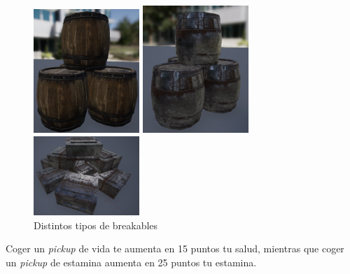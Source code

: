 \begin{itemize}
\begin{figure}[H]
  \begin{minipage}{0.33\textwidth}
    \centering
    \includegraphics[width=4cm]{./images/Dest_Barr2.png}
  \end{minipage}%
  \hspace{0.5mm}
  \begin{minipage}{0.33\textwidth}
    \centering
    \includegraphics[width=4cm]{./images/Dest_Barr.png}
  \end{minipage}
  \hspace{0.5mm}
  \begin{minipage}{0.33\textwidth}
    \centering
    \includegraphics[width=4cm]{./images/Dest_Box.png}
  \end{minipage}
  \caption{Distintos tipos de breakables}
  \label{Breakables}
\end{figure}

Coger un \textit{pickup} de vida te aumenta en 15 puntos tu salud, mientras que coger un \textit{pickup} de estamina aumenta en 25 puntos tu estamina.



\end{itemize}
